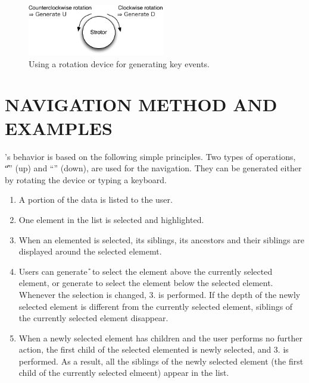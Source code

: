 \documentclass{article}
\begin{document}

\begin{figure}[H]
\centerline{\includegraphics[width=60mm,bb=0 0 294 110]{figures/rotation.pdf}}
\caption{Using a rotation device for generating key events.}
\label{rotation}
\end{figure}

\section*{NAVIGATION METHOD AND EXAMPLES}

{\ST}'s behavior is based on the following simple principles.
Two types of operations, ``{\U}'' (up) and ``{\D}'' (down), are used for the navigation.
They can be generated either by rotating the {\ST} device or typing a keyboard.

\begin{enumerate}
\item A portion of the data is listed to the user.

\item One element in the list is selected and highlighted.


\item When an elemented is selected, its siblings, its ancestors and their siblings are displayed
around the selected elememt.

\item Users can generate {\U} to select the element above the currently selected element,
or generate {\D} to select the element below the selected element.
Whenever the selection is changed, 3. is performed.
If the depth of the newly selected element is different from the currently
selected element, siblings of the currently selected element disappear.

\item When a newly selected element has children and the user performs no further action,
the first child of the selected elemented is newly selected, and 3. is performed.
As a result, all the siblings of the newly selected element
(the first child of the currently selected elmeent) appear in the list.

\end{enumerate}
\end{document}
